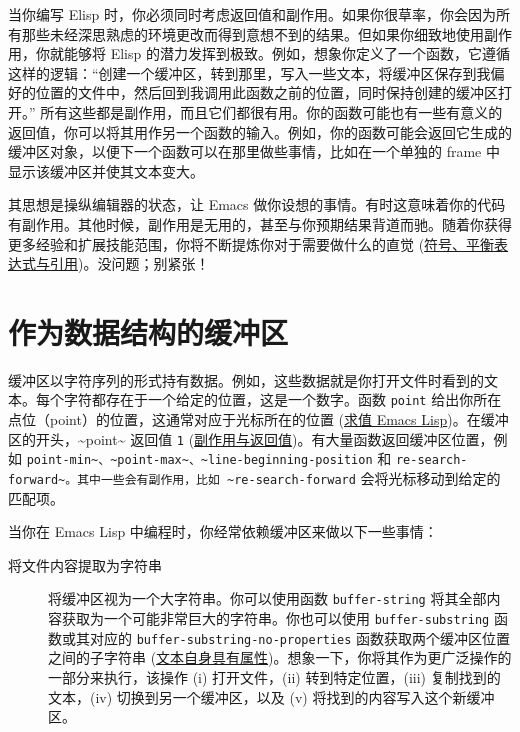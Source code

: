 \documentclass[11pt]{ctexart}
\begin{document}
当你编写 Elisp 时，你必须同时考虑返回值和副作用。如果你很草率，你会因为所有那些未经深思熟虑的环境更改而得到意想不到的结果。但如果你细致地使用副作用，你就能够将 Elisp 的潜力发挥到极致。例如，想象你定义了一个函数，它遵循这样的逻辑：“创建一个缓冲区，转到那里，写入一些文本，将缓冲区保存到我偏好的位置的文件中，然后回到我调用此函数之前的位置，同时保持创建的缓冲区打开。” 所有这些都是副作用，而且它们都很有用。你的函数可能也有一些有意义的返回值，你可以将其用作另一个函数的输入。例如，你的函数可能会返回它生成的缓冲区对象，以便下一个函数可以在那里做些事情，比如在一个单独的 frame 中显示该缓冲区并使其文本变大。

其思想是操纵编辑器的状态，让 Emacs 做你设想的事情。有时这意味着你的代码有副作用。其他时候，副作用是无用的，甚至与你预期结果背道而驰。随着你获得更多经验和扩展技能范围，你将不断提炼你对于需要做什么的直觉 (\hyperref[sec:orgb51d706]{符号、平衡表达式与引用})。没问题；别紧张！
\section{作为数据结构的缓冲区}
\label{sec:orgc0d6740}
缓冲区以字符序列的形式持有数据。例如，这些数据就是你打开文件时看到的文本。每个字符都存在于一个给定的位置，这是一个数字。函数 \texttt{point} 给出你所在点位（point）的位置，这通常对应于光标所在的位置 (\hyperref[sec:org5e72a31]{求值 Emacs Lisp})。在缓冲区的开头，\textasciitilde{}point\textasciitilde{} 返回值 \texttt{1} (\hyperref[sec:org7601617]{副作用与返回值})。有大量函数返回缓冲区位置，例如 \texttt{point-min\textasciitilde{}、\textasciitilde{}point-max\textasciitilde{}、\textasciitilde{}line-beginning-position} 和 \texttt{re-search-forward\textasciitilde{}。其中一些会有副作用，比如 \textasciitilde{}re-search-forward} 会将光标移动到给定的匹配项。

当你在 Emacs Lisp 中编程时，你经常依赖缓冲区来做以下一些事情：

\begin{description}
\item[{将文件内容提取为字符串}] 将缓冲区视为一个大字符串。你可以使用函数 \texttt{buffer-string} 将其全部内容获取为一个可能非常巨大的字符串。你也可以使用 \texttt{buffer-substring} 函数或其对应的 \texttt{buffer-substring-no-properties} 函数获取两个缓冲区位置之间的子字符串 (\hyperref[sec:orgea51fad]{文本自身具有属性})。想象一下，你将其作为更广泛操作的一部分来执行，该操作 (i) 打开文件，(ii) 转到特定位置，(iii) 复制找到的文本，(iv) 切换到另一个缓冲区，以及 (v) 将找到的内容写入这个新缓冲区。
\end{description}
\end{document}
